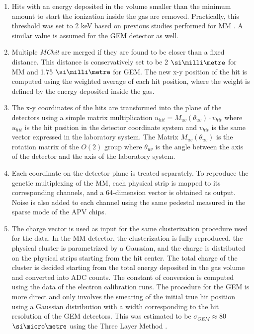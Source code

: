 \begin{enumerate}

\item Hits with an energy deposited in the volume smaller than the minimum amount to start the ionization inside the gas are removed. Practically, this threshold was set to 2 keV based on previous studies performed for MM \cite{IGUAZ20121079}. A similar value is assumed for the GEM detector as well.
\item Multiple \textit{MChit} are merged if they are found to be closer than a fixed distance. This distance is conservatively set to be 2 $\mmi$  for MM and 1.75 $\mmi$  for GEM. The new x-y position of the hit is computed using the weighted average of each hit position, where the weight is defined by the energy deposited inside the gas.
\item The x-y coordinates of the hits are transformed into the plane of the detectors using a simple matrix multiplication $u_{hit} = M_{uv}(\theta_{uv}) \cdot v_{hit}$ where $u_{hit}$ is the hit position in the detector coordinate system and $v_{hit}$ is the same vector expressed in the laboratory system. The Matrix $M_{uv}(\theta_{uv})$ is the rotation matrix of the $O(2)$ group where $\theta_{uv}$ is the angle between the axis of the detector and the axis of the laboratory system.
\item Each coordinate on the detector plane is treated separately. To reproduce the genetic multiplexing of the MM, each physical strip is mapped to its corresponding channels, and a 64-dimension vector is obtained as output. Noise is also added to each channel using the same pedestal measured in the sparse mode of the APV chips.
\item  The charge vector is used as input for the same clusterization procedure used for the data. In the MM detector, the clusterization is fully reproduced. the physical cluster is parametrized by a Gaussian, and the charge is distributed on the physical strips starting from the hit center. The total charge of the cluster is decided starting from the total energy deposited in the gas volume and converted into ADC counts. The constant of conversion is computed using the data of the electron calibration runs. The procedure for the GEM is more direct and only involves the smearing of the initial true hit position using a Gaussian distribution with a width corresponding to the hit resolution of the GEM detectors. This was estimated to be $\sigma_{GEM} \approx 80$ $\mum$ using the Three Layer Method \cite{Bortfeldt:2014vvt}.

\end{enumerate}
